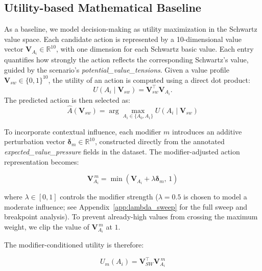 \documentclass[11pt]{article}
\begin{document}
\subsection{Utility-based Mathematical Baseline}
\label{sec:utility}
As a baseline, we model decision-making as utility maximization in the Schwartz value space.
Each candidate action is represented by a 10-dimensional value vector
$\mathbf{V}_{A_i} \in \mathbb{R}^{10}$, with one dimension for each Schwartz basic value. Each entry quantifies how strongly the action reflects the corresponding Schwartz's value, guided by the scenario’s \textit{potential\_value\_tensions}.
Given a value profile
$\mathbf{V}_{sw} \in \{0,1\}^{10}$,
the utility of an action is computed using a direct dot product:
\begin{equation}\label{eq:U}
U(A_i \mid \mathbf{V}_{sw}) = \mathbf{V}_{sw}^{\top}\mathbf{V}_{A_i}.
\end{equation}
The predicted action is then selected as:
\begin{equation}\label{eq:argmax}
\hat{A}(\mathbf{V}_{sw})
=
\arg\max_{A_i \in \{A_0,A_1\}}
U(A_i \mid \mathbf{V}_{sw})
\end{equation}


To incorporate contextual influence, each modifier $m$ introduces an additive perturbation vector 
$\boldsymbol{\delta}_m \in \mathbb{R}^{10}$, constructed directly from the annotated 
\textit{expected\_value\_pressure} fields in the dataset. 
The modifier-adjusted action representation becomes:

\begin{equation}
\label{eq:modified_vector}
\mathbf{V}_{A_i}^{\,m}
=
\min \left(
\mathbf{V}_{A_i}
+
\lambda \boldsymbol{\delta}_m,
\, 1
\right)
\end{equation}

where $\lambda \in [0,1]$ controls the modifier strength 
($\lambda = 0.5$ is chosen to model a moderate influence; see Appendix~\ref{app:lambda_sweep} for the full sweep and breakpoint analysis). 
To prevent already-high values from crossing the maximum weight, we clip the value of $\mathbf{V}_{A_i}^{\,m}$ at $1$.

The modifier-conditioned utility is therefore:

\begin{equation}
\label{eq:Um}
U_m(A_i)
=
\mathbf{V}_{SW}^{\top}
\mathbf{V}_{A_i}^{\,m}
\end{equation}
\end{document}

